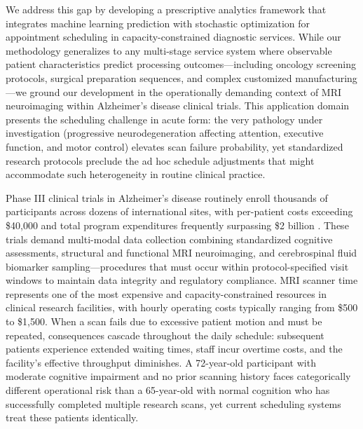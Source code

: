 We address this gap by developing a prescriptive analytics framework that integrates machine learning prediction with stochastic optimization for appointment scheduling in capacity-constrained diagnostic services. While our methodology generalizes to any multi-stage service system where observable patient characteristics predict processing outcomes---including oncology screening protocols, surgical preparation sequences, and complex customized manufacturing---we ground our development in the operationally demanding context of MRI neuroimaging within Alzheimer's disease clinical trials. This application domain presents the scheduling challenge in acute form: the very pathology under investigation (progressive neurodegeneration affecting attention, executive function, and motor control) elevates scan failure probability, yet standardized research protocols preclude the ad hoc schedule adjustments that might accommodate such heterogeneity in routine clinical practice.

Phase III clinical trials in Alzheimer's disease routinely enroll thousands of participants across dozens of international sites, with per-patient costs exceeding \$40,000 and total program expenditures frequently surpassing \$2 billion \citep{cummings2014clinical}. These trials demand multi-modal data collection combining standardized cognitive assessments, structural and functional MRI neuroimaging, and cerebrospinal fluid biomarker sampling---procedures that must occur within protocol-specified visit windows to maintain data integrity and regulatory compliance. MRI scanner time represents one of the most expensive and capacity-constrained resources in clinical research facilities, with hourly operating costs typically ranging from \$500 to \$1,500. When a scan fails due to excessive patient motion and must be repeated, consequences cascade throughout the daily schedule: subsequent patients experience extended waiting times, staff incur overtime costs, and the facility's effective throughput diminishes. A 72-year-old participant with moderate cognitive impairment and no prior scanning history faces categorically different operational risk than a 65-year-old with normal cognition who has successfully completed multiple research scans, yet current scheduling systems treat these patients identically.

